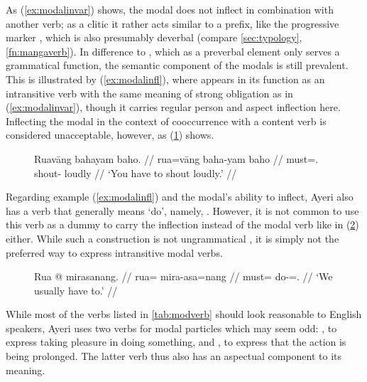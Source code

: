 As (\ref{ex:modalinvar}) shows, the modal does not inflect in combination with
another verb; as a clitic it rather acts similar to a prefix, like the
progressive marker , which is also presumably deverbal
(compare \autoref{sec:typology}, \autoref{fn:mangaverb}). In difference to
, which as a preverbal element only serves a grammatical
function, the semantic component of the modals is still prevalent. This is
illustrated by (\ref{ex:modalinfl}), where  appears in its
function as an intransitive verb with the same meaning of strong obligation as
in (\ref{ex:modalinvar}), though it carries regular person and aspect
inflection here. Inflecting the modal in the context of cooccurrence with a
content verb is considered unacceptable, however, as (\ref{ex:modalinfl_2})
shows.

\begin{figure}[h]
\ex\label{ex:modalinfl_2}\ljudge*\begingl
	\gla Ruavāng bahayam baho. //
	\glb rua=vāng baha-yam baho //
	\glc must=\Second{}.\AgtT{} shout-\Ptcp{} loudly //
	\glft `You have to shout loudly.' //
\endgl\xe
\end{figure}

Regarding example (\ref{ex:modalinfl}) and the modal's ability to inflect,
Ayeri also has a verb that generally means `do', namely, .
However, it is not common to use this verb as a dummy to carry the inflection
instead of the modal verb like in (\ref{ex:modaldummy}) either. While such a
construction is not ungrammatical , it is simply not the preferred
way to express intransitive modal verbs.

\begin{figure}[h]
\ex\label{ex:modaldummy}\ljudge\ques\begingl
	\gla Rua @ mirasanang. //
	\glb rua= mira-asa=nang //
	\glc must= do-\Hab{}=\Fpl{}.\Aarg{} //
	\glft `We usually have to.' //
\endgl\xe
\end{figure}

While most of the verbs listed in \autoref{tab:modverb} should look reasonable
to English speakers, Ayeri uses two verbs for modal particles which may seem
odd: , to express taking pleasure in doing something,
and , to express that the action is being
prolonged. The latter verb thus also has an aspectual component to its meaning.


